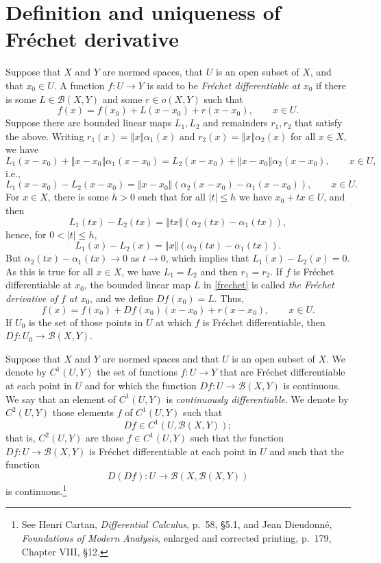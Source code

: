 \documentclass{article}
\newcommand{\norm}[1]{\left\Vert #1 \right\Vert}
\theoremstyle{definition}
\begin{document}
\section{Definition and uniqueness of Fr\'echet derivative}
Suppose that $X$ and $Y$ are normed spaces, that  $U$ is an open subset of $X$, and  that $x_0 \in U$. A function  $f:U \to Y$
 is said to be {\em Fr\'echet differentiable at $x_0$} if there is some $L \in \mathscr{B}(X,Y)$
and some $r \in o(X,Y)$ such that
\begin{equation}
f(x) = f(x_0) + L(x-x_0)+r(x-x_0), \qquad x \in U.
\label{frechet}
\end{equation}
Suppose there are bounded linear maps $L_1,L_2$ and remainders $r_1,r_2$ that satisfy the above. 
Writing $r_1(x)=\norm{x}\alpha_1(x)$ and $r_2(x)=\norm{x}\alpha_2(x)$ for all $x \in X$, we have
\[
L_1(x-x_0)+\norm{x-x_0}\alpha_1(x-x_0)=L_2(x-x_0)+\norm{x-x_0}\alpha_2(x-x_0), \qquad x \in U,
\]
i.e.,
\[
L_1(x-x_0)-L_2(x-x_0) = \norm{x-x_0}(\alpha_2(x-x_0)-\alpha_1(x-x_0)), \qquad x \in U.
\]
For $x \in X$, there is some $h>0$ such that for all $|t| \leq h$ we have  $x_0+tx \in U$, and then
\[
L_1(tx)-L_2(tx) = \norm{tx}(\alpha_2(tx)-\alpha_1(tx)),
\]
hence, for $0<|t| \leq h$,
\[
L_1(x)-L_2(x) = \norm{x}(\alpha_2(tx)-\alpha_1(tx)).
\]
But $\alpha_2(tx)-\alpha_1(tx) \to 0$ as $t \to 0$, which implies that $L_1(x)-L_2(x)=0$. As this is true for all $x \in X$,
we have $L_1=L_2$ and then $r_1=r_2$. 
If $f$ is Fr\'echet differentiable at $x_0$, 
the bounded linear map $L$ in \eqref{frechet} is called {\em the  Fr\'echet derivative of $f$ at $x_0$}, and we define
$Df(x_0)=L$. Thus, 
\[
f(x)=f(x_0)+Df(x_0)(x-x_0)+r(x-x_0), \qquad x \in U.
\]
If $U_0$ is the set of those points in $U$ at which $f$ is Fr\'echet differentiable, then
$Df:U_0 \to \mathscr{B}(X,Y)$.


Suppose that $X$ and $Y$ are normed spaces and that $U$ is an open subset of $X$.
We denote by $C^1(U,Y)$ the set of functions $f:U \to Y$ that are Fr\'echet differentiable at each point in $U$ and for
which the function $Df:U \to \mathscr{B}(X,Y)$ is continuous. We say that an element of $C^1(U,Y)$ is {\em continuously
differentiable}. We denote by $C^2(U,Y)$ those elements $f$ of $C^1(U,Y)$ such that
\[
Df \in C^1(U,\mathscr{B}(X,Y));
\]
that is, $C^2(U,Y)$ are those $f \in C^1(U,Y)$ such that the function $Df:U \to \mathscr{B}(X,Y)$ is Fr\'echet differentiable at each point in $U$ and such that 
the function
\[
D(Df):U \to \mathscr{B}(X,\mathscr{B}(X,Y))
\]
is continuous.\footnote{See Henri Cartan, {\em Differential Calculus}, p.~58, \S 5.1, and Jean Dieudonn\'e, {\em Foundations of Modern Analysis},
enlarged and corrected printing, p.~179, Chapter VIII, \S 12.}
\end{document}
